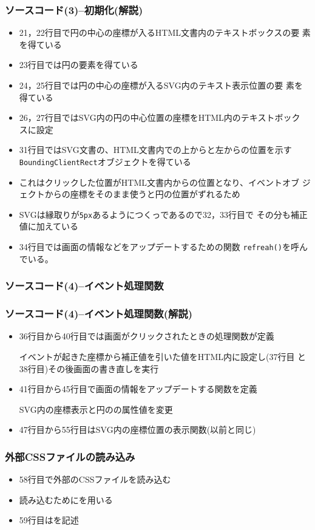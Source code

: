 \begin{frame}[containsverbatim]
 \frametitle{ソースコード(3)--初期化(解説)}
 \begin{itemize}
	\item 21，22行目で円の中心の座標が入るHTML文書内のテキストボックスの要
				素を得ている
	\item 23行目では円の要素を得ている
	\item 24，25行目では円の中心の座標が入るSVG内のテキスト表示位置の要
				素を得ている
	\item 26，27行目ではSVG内の円の中心位置の座標をHTML内のテキストボック
				スに設定
	\item 31行目ではSVG文書の、HTML文書内での上からと左からの位置を示す
				\texttt{BoundingClientRect}オブジェクトを得ている
	\item これはクリックした位置がHTML文書内からの位置となり、イベントオブ
				ジェクトからの座標をそのまま使うと円の位置がずれるため
	\item SVGは縁取りが\texttt{5px}あるようにつくっであるので32，33行目で
				その分も補正値に加えている
	\item 34行目では画面の情報などをアップデートするための関数
				\texttt{refreah()}を呼んでいる。
 \end{itemize}
\end{frame}
\begin{frame}[containsverbatim]
 \frametitle{ソースコード(4)--イベント処理関数}
\end{frame}
\begin{frame}[containsverbatim]
 \frametitle{ソースコード(4)--イベント処理関数(解説)}
 \begin{itemize}
	\item 36行目から40行目では画面がクリックされたときの処理関数が定義

				イベントが起きた座標から補正値を引いた値をHTML内に設定し(37行目
				と38行目)その後画面の書き直しを実行
	\item 41行目から45行目で画面の情報をアップデートする関数を定義

				SVG内の座標表示と円のの属性値を変更
	\item 47行目から55行目はSVG内の座標位置の表示関数(以前と同じ)
 \end{itemize}
\end{frame}
 \begin{frame}[containsverbatim]
  \frametitle{外部CSSファイルの読み込み}
  \begin{itemize}
   \item 58行目で外部のCSSファイルを読み込む
   \item 読み込むためにを用いる
   \item 59行目はを記述
  \end{itemize}
 \end{frame}

